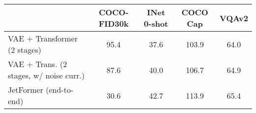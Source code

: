 \begin{tabular}{lcccc}
\toprule
& COCO-FID30k & INet 0-shot & COCO Cap & VQAv2 \\
\midrule
VAE + Transformer (2 stages) &
95.4 &
37.6 &
103.9 &
64.0 \\
VAE + Trans. (2 stages, w/ noise curr.) &
87.6 &
40.0 &
106.7 &
64.9 \\
JetFormer (end-to-end) &
30.6 &
42.7 &
113.9 &
65.4 \\
\bottomrule
\end{tabular}
